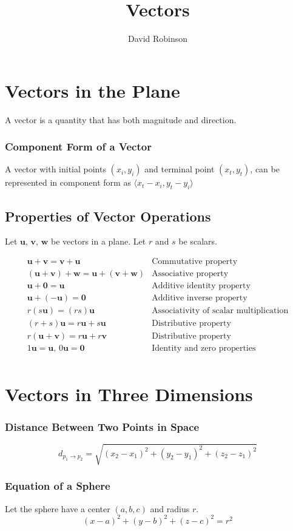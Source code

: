 \documentclass{article}
\title{Vectors}
\author{David Robinson}
\date{}
\begin{document}
\maketitle

\section*{Vectors in the Plane}

A vector is a quantity that has both magnitude and direction.

\subsubsection*{Component Form of a Vector}
A vector with initial points $(x_i, y_i)$ and terminal point $(x_t, y_t)$, can be represented in component form as $\langle x_t - x_i, y_t - y_i \rangle$

\subsection*{Properties of Vector Operations}
Let $\mathbf{u}$, $\mathbf{v}$, $\mathbf{w}$ be vectors in a plane. Let $r$ and $s$ be scalars.

\[
\begin{array}{ll}
\mathbf{u} + \mathbf{v} = \mathbf{v} + \mathbf{u} & \text{Commutative property} \\[5pt]
(\mathbf{u} + \mathbf{v}) + \mathbf{w} = \mathbf{u} + (\mathbf{v} + \mathbf{w}) & \text{Associative property} \\[5pt]
\mathbf{u} + \mathbf{0} = \mathbf{u} & \text{Additive identity property} \\[5pt]
\mathbf{u} + (-\mathbf{u}) = \mathbf{0} & \text{Additive inverse property} \\[5pt]
r (s \mathbf{u}) = (rs) \mathbf{u} & \text{Associativity of scalar multiplication} \\[5pt]
(r + s) \mathbf{u} = r\mathbf{u} + s\mathbf{u} & \text{Distributive property} \\[5pt]
r (\mathbf{u} + \mathbf{v}) = r\mathbf{u} + r\mathbf{v} & \text{Distributive property} \\[5pt]
1 \mathbf{u} = \mathbf{u}, \, 0\mathbf{u} = \mathbf{0} & \text{Identity and zero properties} \\[5pt]
\end{array}
\]

\section*{Vectors in Three Dimensions}

\subsubsection*{Distance Between Two Points in Space}
\[d_{p_1\rightarrow p_2} = \sqrt{{(x_2 - x_1)}^2 + {(y_2 - y_1)}^2 + {(z_2 - z_1)}^2}\]

\subsubsection*{Equation of a Sphere}
Let the sphere have a center $(a, b, c)$ and radius $r$.
\[{(x-a)}^2 + {(y-b)}^2 + {(z-c)}^2 = r^2\]
\end{document}
